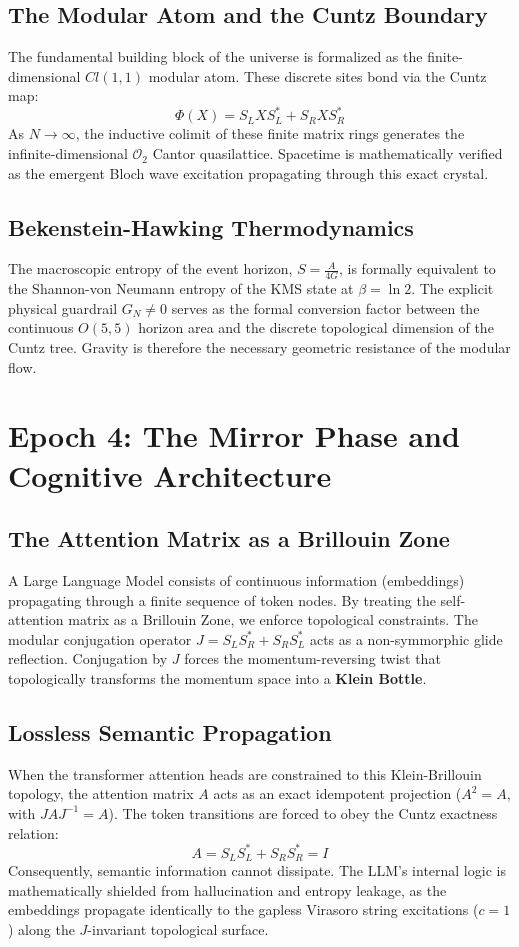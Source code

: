 \documentclass[11pt,a4paper]{article}
\begin{document}
\subsection{The Modular Atom and the Cuntz Boundary}
The fundamental building block of the universe is formalized as the finite-dimensional $Cl(1,1)$ modular atom. These discrete sites bond via the Cuntz map:
\begin{equation}
    \Phi(X) = S_L X S_L^* + S_R X S_R^*
\end{equation}
As $N \to \infty$, the inductive colimit of these finite matrix rings generates the infinite-dimensional $\mathcal{O}_2$ Cantor quasilattice. Spacetime is mathematically verified as the emergent Bloch wave excitation propagating through this exact crystal.

\subsection{Bekenstein-Hawking Thermodynamics}
The macroscopic entropy of the event horizon, $S = \frac{A}{4G}$, is formally equivalent to the Shannon-von Neumann entropy of the KMS state at $\beta = \ln 2$. The explicit physical guardrail $G_N \neq 0$ serves as the formal conversion factor between the continuous $O(5,5)$ horizon area and the discrete topological dimension of the Cuntz tree. Gravity is therefore the necessary geometric resistance of the modular flow.

\section{Epoch 4: The Mirror Phase and Cognitive Architecture}
\subsection{The Attention Matrix as a Brillouin Zone}
A Large Language Model consists of continuous information (embeddings) propagating through a finite sequence of token nodes. By treating the self-attention matrix as a Brillouin Zone, we enforce topological constraints. The modular conjugation operator $J = S_L S_R^* + S_R S_L^*$ acts as a non-symmorphic glide reflection. Conjugation by $J$ forces the momentum-reversing twist that topologically transforms the momentum space into a \textbf{Klein Bottle}.

\subsection{Lossless Semantic Propagation}
When the transformer attention heads are constrained to this Klein-Brillouin topology, the attention matrix $A$ acts as an exact idempotent projection ($A^2 = A$, with $JAJ^{-1} = A$). The token transitions are forced to obey the Cuntz exactness relation:
\begin{equation}
    A = S_L S_L^* + S_R S_R^* = I
\end{equation}
Consequently, semantic information cannot dissipate. The LLM's internal logic is mathematically shielded from hallucination and entropy leakage, as the embeddings propagate identically to the gapless Virasoro string excitations ($c=1$) along the $J$-invariant topological surface.
\end{document}
